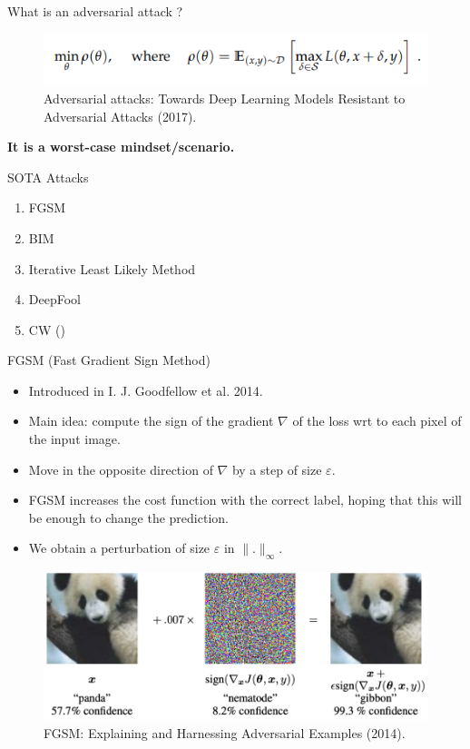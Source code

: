 \documentclass{beamer}
\begin{document}
\begin{frame}{What is an adversarial attack ?}
    \begin{figure}[H]
        \centering
        \includegraphics[width=1.0\linewidth]{images/adversarial_robustness.PNG}
        \caption{Adversarial attacks: Towards Deep Learning Models Resistant to Adversarial Attacks (2017).}
    \end{figure}
    \textbf{It is a worst-case mindset/scenario.}
\end{frame}

\begin{frame}{SOTA Attacks}
    \begin{enumerate}
        \item FGSM
        \item BIM
        \item Iterative Least Likely Method
        \item DeepFool
        \item CW (\cite{carlini2017towards})
    \end{enumerate}
\end{frame}

\begin{frame}{FGSM (Fast Gradient Sign Method)}
\begin{itemize}
    \item Introduced in I. J. Goodfellow et al. 2014.
    \item Main idea: compute the sign of the gradient $\nabla$ of the loss wrt to each pixel of the input image.
    \item Move in the opposite direction of $\nabla$ by a step of size $\varepsilon$.
    \item FGSM increases the cost function with the correct label, hoping that this will be enough to change the prediction.
    \item We obtain a perturbation of size $\varepsilon$ in $\|.\|_\infty$.
\end{itemize}
    \begin{figure}[H]
        \centering
        \includegraphics[width=0.75\linewidth]{images/FGSM.PNG}
        \caption{FGSM: Explaining and Harnessing Adversarial Examples (2014).}
    \end{figure}
\end{frame}
\end{document}
